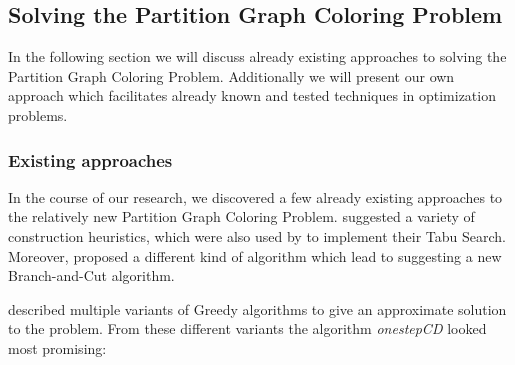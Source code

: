 \documentclass[paper = a4, fontsize = 10pt]{scrartcl}
\begin{document}
\subsection{Solving the Partition Graph Coloring Problem}


In the following section we will discuss already existing approaches to solving the Partition Graph Coloring Problem. Additionally we will present our own approach which facilitates already known and tested techniques in optimization problems.


\subsubsection{Existing approaches}


In the course of our research, we discovered a few already existing approaches to the relatively new Partition Graph Coloring Problem. \citet*{Li2000} suggested a variety of construction heuristics, which were also used by \citet*{Noronha2006} to implement their Tabu Search. Moreover, \citet*{Lu2010} proposed a different kind of algorithm which lead to \citet*{Palladino2011} suggesting a new Branch-and-Cut algorithm.


\citet*{Li2000} described multiple variants of Greedy algorithms to give an approximate solution to the problem. From these different variants the algorithm \emph{onestepCD} looked most promising:
\end{document}
